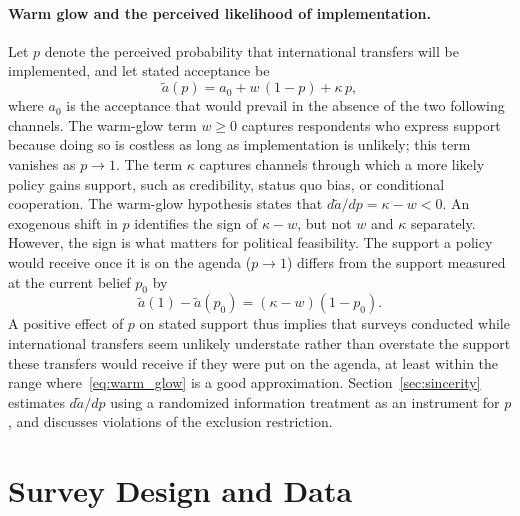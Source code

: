 \documentclass[12pt,english]{article}
\begin{document}
\paragraph{Warm glow and the perceived likelihood of implementation.} Let $p$ denote the perceived probability that international transfers will be implemented, and let stated acceptance be
\begin{equation}\label{eq:warm_glow}
\tilde{a}(p) = a_0 + w\,(1-p) + \kappa\, p,
\end{equation}
where $a_0$ is the acceptance that would prevail in the absence of the two following channels. The warm-glow term $w \geq 0$ captures respondents who express support because doing so is costless as long as implementation is unlikely; this term vanishes as $p \to 1$. The term $\kappa$ captures channels through which a more likely policy gains support, such as credibility, status quo bias, or conditional cooperation. The warm-glow hypothesis states that $d\tilde{a}/dp = \kappa - w < 0$. An exogenous shift in $p$ identifies the sign of $\kappa - w$, but not $w$ and $\kappa$ separately. However, the sign is what matters for political feasibility. The support a policy would receive once it is on the agenda ($p \to 1$) differs from the support measured at the current belief $p_0$ by
\begin{equation}\label{eq:feasibility}
\tilde{a}(1) - \tilde{a}(p_0) = (\kappa - w)(1-p_0).
\end{equation}
A positive effect of $p$ on stated support thus implies that surveys conducted while international transfers seem unlikely understate rather than overstate the support these transfers would receive if they were put on the agenda, at least within the range where~\eqref{eq:warm_glow} is a good approximation. Section~\ref{sec:sincerity} estimates $d\tilde{a}/dp$ using a randomized information treatment as an instrument for $p$, and discusses violations of the exclusion restriction.

\section{Survey Design and Data}\label{sec:data}
\end{document}
